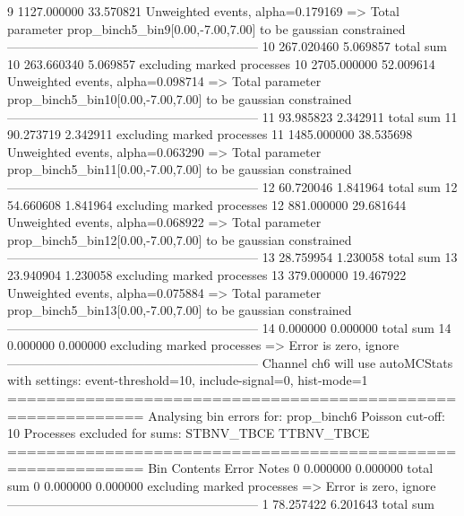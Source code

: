 9          1127.000000     33.570821       Unweighted events, alpha=0.179169
  => Total parameter prop_binch5_bin9[0.00,-7.00,7.00] to be gaussian constrained
------------------------------------------------------------
10         267.020460      5.069857        total sum                     
10         263.660340      5.069857        excluding marked processes    
10         2705.000000     52.009614       Unweighted events, alpha=0.098714
  => Total parameter prop_binch5_bin10[0.00,-7.00,7.00] to be gaussian constrained
------------------------------------------------------------
11         93.985823       2.342911        total sum                     
11         90.273719       2.342911        excluding marked processes    
11         1485.000000     38.535698       Unweighted events, alpha=0.063290
  => Total parameter prop_binch5_bin11[0.00,-7.00,7.00] to be gaussian constrained
------------------------------------------------------------
12         60.720046       1.841964        total sum                     
12         54.660608       1.841964        excluding marked processes    
12         881.000000      29.681644       Unweighted events, alpha=0.068922
  => Total parameter prop_binch5_bin12[0.00,-7.00,7.00] to be gaussian constrained
------------------------------------------------------------
13         28.759954       1.230058        total sum                     
13         23.940904       1.230058        excluding marked processes    
13         379.000000      19.467922       Unweighted events, alpha=0.075884
  => Total parameter prop_binch5_bin13[0.00,-7.00,7.00] to be gaussian constrained
------------------------------------------------------------
14         0.000000        0.000000        total sum                     
14         0.000000        0.000000        excluding marked processes    
  => Error is zero, ignore      
------------------------------------------------------------
Channel ch6 will use autoMCStats with settings: event-threshold=10, include-signal=0, hist-mode=1
============================================================
Analysing bin errors for: prop_binch6
Poisson cut-off: 10
Processes excluded for sums: STBNV_TBCE TTBNV_TBCE
============================================================
Bin        Contents        Error           Notes                         
0          0.000000        0.000000        total sum                     
0          0.000000        0.000000        excluding marked processes    
  => Error is zero, ignore      
------------------------------------------------------------
1          78.257422       6.201643        total sum                     

